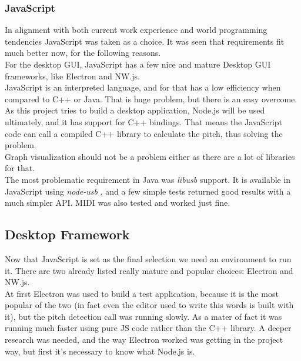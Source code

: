 \subsubsection{JavaScript}
In alignment with both current work experience and world programming tendencies
JavaScript was taken as a choice. It was seen that requirements fit much better now,
for the following reasons. \\
For the desktop GUI, JavaScript has a few nice and mature Desktop GUI frameworks,
like Electron and NW.js. \\
JavaScript is an interpreted language, and for that has a low efficiency when
compared to C++ or Java. That is huge problem, but there is an easy overcome. As
this project tries to build a desktop application, Node.js will be used ultimately,
and it has support for C++ bindings. That means the JavaScript code can call a
compiled C++ library to calculate the pitch, thus solving the problem. \\
Graph visualization should not be a problem either as there are a lot of libraries
for that. \\
The most problematic requirement in Java was \textit{libusb} support. It is available
in JavaScript using \textit{node-usb} \cite{node-usb}, and a few simple tests
returned good results with a much simpler API. MIDI was also tested and worked just fine.

\subsection{Desktop Framework}
Now that JavaScript is set as the final selection we need an environment to run
it. There are two already listed really mature and popular choices: Electron and NW.js. \\
At first Electron was used to build a test application, because it is the most popular
of the two (in fact even the editor used to write this words is built with it),
but the pitch detection call was running slowly. As a mater of fact it was running
much faster using pure JS code rather than the C++ library. A deeper research
was needed, and the way Electron worked was getting in the project way, but first it's
necessary to know what Node.js is.

